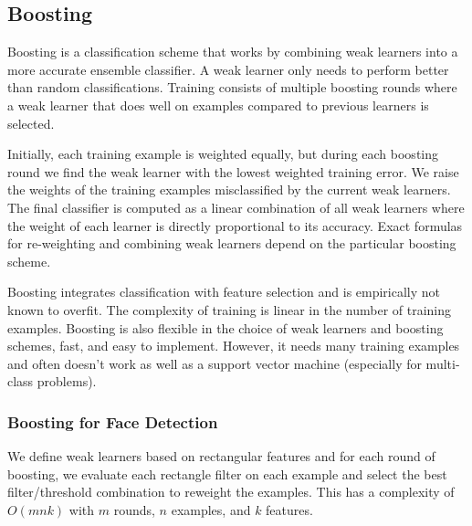 \documentclass{math}
\begin{document}
\subsection*{Boosting}
Boosting is a classification scheme that works by combining weak learners into
a more accurate ensemble classifier. A weak learner only needs to perform better
than random classifications. Training consists of multiple boosting rounds where
a weak learner that does well on examples compared to previous learners is
selected. \par
Initially, each training example is weighted equally, but during each boosting
round we find the weak learner with the lowest weighted training error. We
raise the weights of the training examples misclassified by the current weak
learners. The final classifier is computed as a linear combination of all weak
learners where the weight of each learner is directly proportional to its
accuracy. Exact formulas for re-weighting and combining weak learners depend on
the particular boosting scheme. \par
Boosting integrates classification with feature selection and is empirically not
known to overfit. The complexity of training is linear in the number of training
examples. Boosting is also flexible in the choice of weak learners and boosting
schemes, fast, and easy to implement. However, it needs many training examples
and often doesn't work as well as a support vector machine (especially for
multi-class problems).

\subsubsection*{Boosting for Face Detection}
We define weak learners based on rectangular features and for each round of
boosting, we evaluate each rectangle filter on each example and select the
best filter/threshold combination to reweight the examples. This has a
complexity of \( O(mnk) \) with \( m \) rounds, \( n \) examples, and \( k \)
features.
\end{document}
